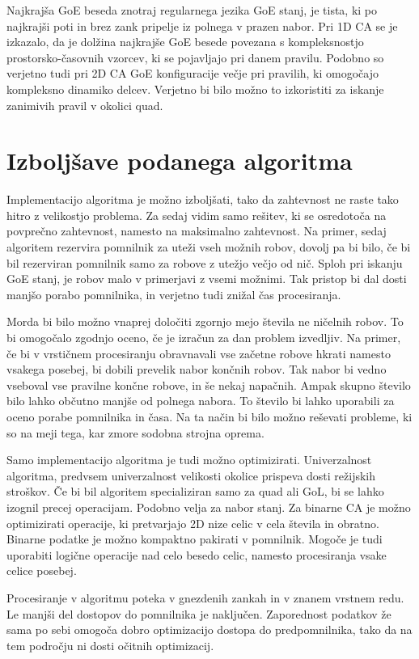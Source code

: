 \documentclass[12pt,a4paper,openany,twoside]{book}
\begin{document}
Najkrajša GoE beseda znotraj regularnega jezika GoE stanj, je tista,
ki po najkrajši poti in brez zank pripelje iz polnega v prazen nabor.
Pri 1D CA se je izkazalo, da je dolžina najkrajše GoE besede povezana s kompleksnostjo
prostorsko-časovnih vzorcev, ki se pojavljajo pri danem pravilu.
Podobno so verjetno tudi pri 2D CA GoE konfiguracije večje pri pravilih,
ki omogočajo kompleksno dinamiko delcev. Verjetno bi bilo možno to izkoristiti
za iskanje zanimivih pravil v okolici quad.

\section{Izboljšave podanega algoritma}

Implementacijo algoritma je možno izboljšati, tako da zahtevnost
ne raste tako hitro z velikostjo problema.
Za sedaj vidim samo rešitev, ki se osredotoča na povprečno zahtevnost, namesto na maksimalno zahtevnost.
Na primer, sedaj algoritem rezervira pomnilnik za uteži vseh možnih robov,
dovolj pa bi bilo, če bi bil rezerviran pomnilnik samo za robove z utežjo večjo od nič.
Sploh pri iskanju GoE stanj, je robov malo v primerjavi z vsemi možnimi.
Tak pristop bi dal dosti manjšo porabo pomnilnika,
in verjetno tudi znižal čas procesiranja.

Morda bi bilo možno vnaprej določiti zgornjo mejo števila ne ničelnih robov.
To bi omogočalo zgodnjo oceno, če je izračun za dan problem izvedljiv.
Na primer, če bi v vrstičnem procesiranju obravnavali vse začetne robove hkrati
namesto vsakega posebej, bi dobili prevelik nabor končnih robov.
Tak nabor bi vedno vseboval vse pravilne končne robove, in še nekaj napačnih.
Ampak skupno število bilo lahko občutno manjše od polnega nabora.
To število bi lahko uporabili za oceno porabe pomnilnika in časa.
Na ta način bi bilo možno reševati probleme, ki so na meji tega,
kar zmore sodobna strojna oprema.

Samo implementacijo algoritma je tudi možno optimizirati.
Univerzalnost algoritma, predvsem univerzalnost velikosti okolice
prispeva dosti režijskih stroškov. Če bi bil algoritem specializiran
samo za quad ali GoL, bi se lahko izognil precej operacijam.
Podobno velja za nabor stanj. Za binarne CA je možno optimizirati
operacije, ki pretvarjajo 2D nize celic v cela števila in obratno.
Binarne podatke je možno kompaktno pakirati v pomnilnik.
Mogoče je tudi uporabiti logične operacije nad celo besedo celic,
namesto procesiranja vsake celice posebej.

Procesiranje v algoritmu poteka v gnezdenih zankah in v znanem vrstnem redu.
Le manjši del dostopov do pomnilnika je naključen.
Zaporednost podatkov že sama po sebi omogoča dobro optimizacijo dostopa do predpomnilnika,
tako da na tem področju ni dosti očitnih optimizacij.
\end{document}

